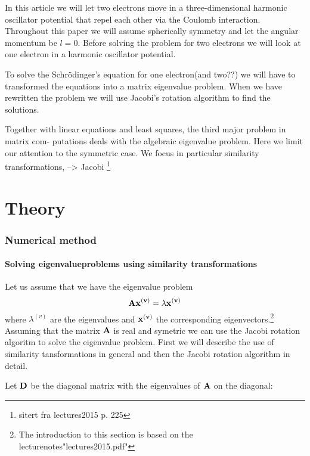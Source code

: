 \documentclass[11pt,a4wide]{article}
\begin{document}
In this article we will let two electrons move in a three-dimensional harmonic oscillator potential that repel each other via the Coulomb interaction.  Throughout this paper we will assume spherically symmetry and let the angular momentum be $l=0$. Before solving the problem for two electrons we will look at one electron in a harmonic oscillator potential. 

To solve the Schr\"odinger's equation for one electron(and two??) we will have to transformed the equations into a matrix eigenvalue problem. When we have rewritten the problem we will use Jacobi's rotation algorithm to find the solutions. %

Together with linear equations and least squares, the third major problem in matrix com- putations deals with the algebraic eigenvalue problem. Here we limit our attention to the symmetric case. We focus in particular similarity transformations, --> Jacobi \footnote{sitert fra lectures2015 p. 225}


\newpage
\part{Theory}

\section{Numerical method}
\subsection{Solving eigenvalueproblems using similarity transformations}

Let us assume that we have the eigenvalue problem 
\[
\bf A \bf x^{(v)} = \lambda \bf x^{(v)}
\]
where $\lambda^{(v)}$ are the eigenvalues and $\bf x^{(v)}$ the corresponding eigenvectors.\footnote{The introduction to this section is based on the lecturenotes"lectures2015.pdf"} Assuming that the matrix $\bf A$ is real and symetric we can use the Jacobi rotation algoritm to solve the eigenvalue problem. First we will describe the use of similarity tansformations in general and then the Jacobi rotation algorithm in detail.

Let $\bf D$ be the diagonal matrix with the eigenvalues of $\bf A$ on the diagonal:
\end{document}
